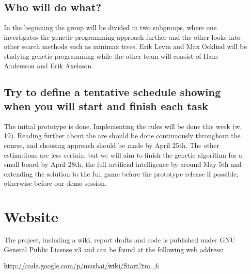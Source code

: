 \documentclass[times, 10pt,twocolumn]{article}
\begin{document}
\subsection{Who will do what?}

In the beginning the group will be divided in two subgroups, where one investigates the genetic programming approach further and the other looks into other search methods such as minimax trees. Erik Levin and Max Ocklind will be studying genetic programming while the other team will consist of Hans Andersson and Erik Axelsson.

\subsection{Try to define a tentative schedule showing when you will start and finish each task}

The initial prototype is done. Implementing the rules will be done this week (w. 19). Reading further about the are should be done continuously throughout the course, and choosing approach should be made by April 25th. The other estimations are less certain, but we will aim to finish the genetic algorithm for a small board by April 28th, the full artificial intelligence by around May 5th and extending the solution to the full game before the prototype release if possible, otherwise before our demo session.

\section{Website}
The project, including a wiki, report drafts and code is published under GNU General Public License v3 and can be found at the following web address:

\url{http://code.google.com/p/mushai/wiki/Start?tm=6}



\end{document}
